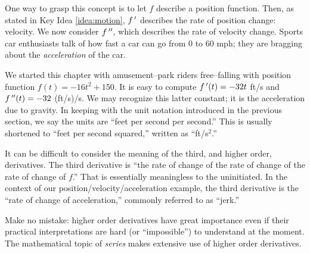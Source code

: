 One way to grasp this concept is to let $f$ describe a position function. Then, as stated in Key Idea \ref{idea:motion}, $f\,'$ describes the rate of position change: velocity. We now consider $f\,''$, which describes the rate of velocity change. Sports car enthusiasts talk of how fast a car can go from 0 to 60 mph; they are bragging about the \textit{acceleration} of the car.

We started this chapter with amusement--park riders free--falling with position function $f(t) = -16t^2+150$. It is easy to compute $f\,'(t)=-32t$ ft/s and $f\,''(t) = -32$ (ft/s)/s. We may recognize this latter constant; it is the acceleration due to gravity. In keeping with the unit notation introduced in the previous section, we say the units are ``feet per second per second.'' This is usually shortened to ``feet per second squared,'' written as ``ft/s$^2$.''

It can be difficult to consider the meaning of the third, and higher order, derivatives. The third derivative is ``the rate of change of the rate of change of the rate of change of $f$.'' That is essentially meaningless to the uninitiated. In the context of our position/velocity/acceleration example, the third derivative is the ``rate of change of acceleration,'' commonly referred to as ``jerk.'' 

Make no mistake: higher order derivatives have great importance even if their practical interpretations are hard (or ``impossible'') to understand at the moment. The mathematical topic of \textit{series} makes extensive use of higher order derivatives.

